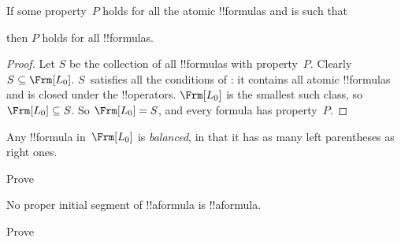\documentclass[../../../include/open-logic-section]{subfiles}
\begin{document}


\begin{thm}
  If some property~$P$ holds for all the atomic !!{formula}s and is
  such that
  \begin{enumerate}
  \end{enumerate}
  then $P$ holds for all !!{formula}s.
\end{thm}

\begin{proof}
  Let $S$ be the collection of all !!{formula}s with
  property~$P$. Clearly $S \subseteq \Frm[L_0]$. $S$~satisfies all the
  conditions of : it contains all atomic
  !!{formula}s and is closed under the !!{operator}s.  $\Frm[L_0]$ is
  the smallest such class, so $\Frm[L_0] \subseteq S$. So $\Frm[L_0] = S$, and
  every formula has property~$P$.
\end{proof}

\begin{prop}
   Any !!{formula} in~$\Frm[L_0]$ is \emph{balanced}, in that it has
   as many left parentheses as right ones.
\end{prop}

\begin{prob} 
Prove 
\end{prob}

\begin{prop} 
No proper initial segment of !!a{formula} is !!a{formula}.
\end{prop}

\begin{prob}
  Prove 
\end{prob}
\end{document}
